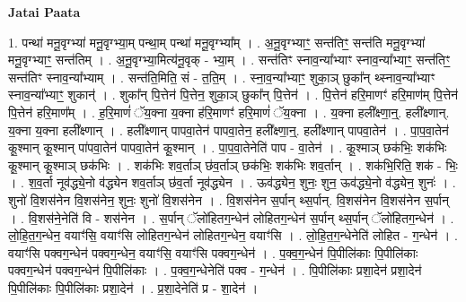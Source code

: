 \documentclass[17pt]{extarticle}
\begin{document}
\textbf{Jatai Paata} \newline

1. पन्था॑ मनू॒वृग्भ्या॑ मनू॒वृग्भ्या॒म् पन्था॒म् पन्था॑ मनू॒वृग्भ्या᳚म् । . अ॒नू॒वृग्भ्याꣳ॒॒ सन्त॑तिꣳ॒॒ सन्त॑ति मनू॒वृग्भ्या॑ मनू॒वृग्भ्याꣳ॒॒ सन्त॑तिम् । . अ॒नू॒वृग्भ्या॒मित्य॑नू॒वृक् - भ्या॒म् । . सन्त॑तिꣳ स्नाव॒न्या᳚भ्याꣳ स्नाव॒न्या᳚भ्याꣳ॒॒ सन्त॑तिꣳ॒॒ सन्त॑तिꣳ स्नाव॒न्या᳚भ्याम् । . सन्त॑ति॒मिति॒ सं - त॒ति॒म् । . स्ना॒व॒न्या᳚भ्याꣳ॒॒ शुका॒ञ् छुका᳚न् थ्स्नाव॒न्या᳚भ्याꣳ स्नाव॒न्या᳚भ्याꣳ॒॒ शुकान्॑ । . शुका᳚न् पि॒त्तेन॑ पि॒त्तेन॒ शुका॒ञ् छुका᳚न् पि॒त्तेन॑ । . पि॒त्तेन॑ हरि॒माणꣳ॑ हरि॒माण॑म् पि॒त्तेन॑ पि॒त्तेन॑ हरि॒माण᳚म् । . ह॒रि॒माणं॑ ॅय॒क्ना य॒क्ना ह॑रि॒माणꣳ॑ हरि॒माणं॑ ॅय॒क्ना । . य॒क्ना हली᳚क्ष्णा॒न्॒. हली᳚क्ष्णान्. य॒क्ना य॒क्ना हली᳚क्ष्णान् । . हली᳚क्ष्णान् पापवा॒तेन॑ पापवा॒तेन॒ हली᳚क्ष्णा॒न्॒. हली᳚क्ष्णान् पापवा॒तेन॑ । . पा॒प॒वा॒तेन॑ कू॒श्मान् कू॒श्मान् पा॑पवा॒तेन॑ पापवा॒तेन॑ कू॒श्मान् । . पा॒प॒वा॒तेनेति॑ पाप - वा॒तेन॑ । . कू॒श्माञ् छक॑भिः॒ शक॑भिः कू॒श्मान् कू॒श्माञ् छक॑भिः । . शक॑भिः शव॒र्ताञ् छ॑व॒र्ताञ् छक॑भिः॒ शक॑भिः शव॒र्तान् । . शक॑भि॒रिति॒ शक॑ - भिः॒ । . श॒व॒र्ता नूव॑द्ध्ये॒नो व॑द्ध्येन शव॒र्ताञ् छ॑व॒र्ता नूव॑द्ध्येन । . ऊव॑द्ध्येन॒ शुनः॒ शुन॒ ऊव॑द्ध्ये॒नो व॑द्ध्येन॒ शुनः॑ । . शुनो॑ वि॒शस॑नेन वि॒शस॑नेन॒ शुनः॒ शुनो॑ वि॒शस॑नेन । . वि॒शस॑नेन स॒र्पान् थ्स॒र्पान्. वि॒शस॑नेन वि॒शस॑नेन स॒र्पान् । . वि॒शस॑ने॒नेति॑ वि - शस॑नेन । . स॒र्पान् ॅलो॑हितग॒न्धेन॑ लोहितग॒न्धेन॑ स॒र्पान् थ्स॒र्पान् ॅलो॑हितग॒न्धेन॑ । . लो॒हि॒त॒ग॒न्धेन॒ वयाꣳ॑सि॒ वयाꣳ॑सि लोहितग॒न्धेन॑ लोहितग॒न्धेन॒ वयाꣳ॑सि । . लो॒हि॒त॒ग॒न्धेनेति॑ लोहित - ग॒न्धेन॑ । . वयाꣳ॑सि पक्वग॒न्धेन॑ पक्वग॒न्धेन॒ वयाꣳ॑सि॒ वयाꣳ॑सि पक्वग॒न्धेन॑ । . प॒क्व॒ग॒न्धेन॑ पि॒पीलि॑काः पि॒पीलि॑काः पक्वग॒न्धेन॑ पक्वग॒न्धेन॑ पि॒पीलि॑काः । . प॒क्व॒ग॒न्धेनेति॑ पक्व - ग॒न्धेन॑ । . पि॒पीलि॑काः प्रशा॒देन॑ प्रशा॒देन॑ पि॒पीलि॑काः पि॒पीलि॑काः प्रशा॒देन॑ । . प्र॒शा॒देनेति॑ प्र - शा॒देन॑ । \newline
\end{document}

